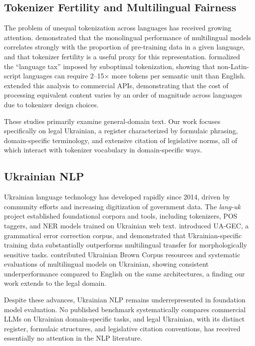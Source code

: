 \documentclass[11pt,a4paper]{article}
\begin{document}
\subsection{Tokenizer Fertility and Multilingual Fairness}

The problem of unequal tokenization across languages has received growing attention. \citet{rust2021good} demonstrated that the monolingual performance of multilingual models correlates strongly with the proportion of pre-training data in a given language, and that tokenizer fertility is a useful proxy for this representation. \citet{petrov2024language} formalized the ``language tax'' imposed by suboptimal tokenization, showing that non-Latin-script languages can require 2--15$\times$ more tokens per semantic unit than English. \citet{ahia2023all} extended this analysis to commercial APIs, demonstrating that the cost of processing equivalent content varies by an order of magnitude across languages due to tokenizer design choices.

These studies primarily examine general-domain text. Our work focuses specifically on legal Ukrainian, a register characterized by formulaic phrasing, domain-specific terminology, and extensive citation of legislative norms, all of which interact with tokenizer vocabulary in domain-specific ways.

\subsection{Ukrainian NLP}

Ukrainian language technology has developed rapidly since 2014, driven by community efforts and increasing digitization of government data. The \textit{lang-uk} project \citep{languk2018} established foundational corpora and tools, including tokenizers, POS taggers, and NER models trained on Ukrainian web text. \citet{syvokon2023uagec} introduced UA-GEC, a grammatical error correction corpus, and demonstrated that Ukrainian-specific training data substantially outperforms multilingual transfer for morphologically sensitive tasks. \citet{chaplynskyi2023ukrbruk} contributed Ukrainian Brown Corpus resources and systematic evaluations of multilingual models on Ukrainian, showing consistent underperformance compared to English on the same architectures, a finding our work extends to the legal domain.

Despite these advances, Ukrainian NLP remains underrepresented in foundation model evaluation. No published benchmark systematically compares commercial LLMs on Ukrainian domain-specific tasks, and legal Ukrainian, with its distinct register, formulaic structures, and legislative citation conventions, has received essentially no attention in the NLP literature.
\end{document}
